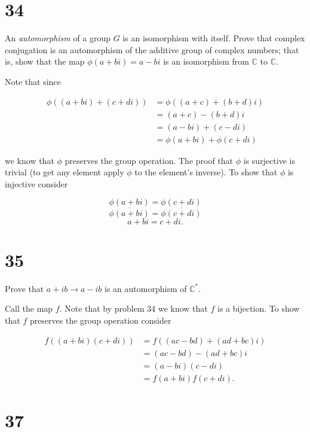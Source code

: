 \documentclass[a4paper]{article}
\begin{document}
\section*{34}

An \textit{automorphism} of a group $G$ is an isomorphism with itself. Prove that complex conjugation is an automorphism of the additive group of complex numbers; that is, show that the map $\phi(a+bi) = a - bi$ is an isomorphism from $\mathbb{C}$ to $\mathbb{C}$.

\vspace{\baselineskip}

Note that since

\begin{align*}
\phi((a+bi) + (c+di)) &= \phi((a+c) + (b+d)i) \\
&= (a+c) - (b+d)i \\
&= (a-bi) + (c-di) \\
&= \phi(a+bi) + \phi(c+di)
\end{align*}

we know that $\phi$ preserves the group operation. The proof that $\phi$ is surjective is trivial (to get any element apply $\phi$ to the element's inverse). To show that $\phi$ is injective consider

$$\phi(a+bi) = \phi(c+di)$$
$$\overline{\phi(a+bi)} = \overline{\phi(c+di)}$$
$$a + bi = c + di.$$


\section*{35}

Prove that $a + ib \rightarrow a- ib$ is an automorphism of $\mathbb{C}^*$.

\vspace{\baselineskip}

Call the map $f$. Note that by problem 34 we know that $f$ is a bijection. To show that $f$ preserves the group operation consider

\begin{align*}
f((a+bi) (c+di)) &= f((ac - bd) + (ad + bc)i) \\
&= (ac - bd) - (ad + bc)i \\
&= (a-bi)(c-di) \\
&= f(a+bi) f(c+di).
\end{align*}


\section*{37}
\end{document}

